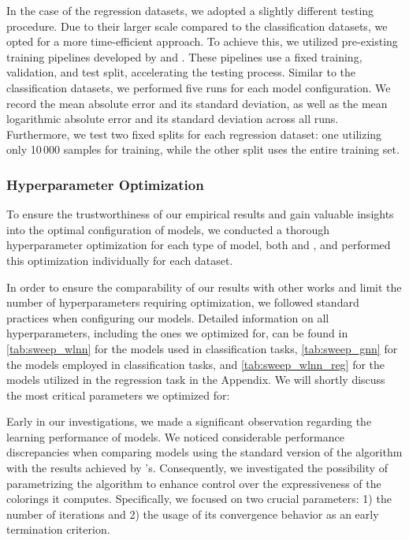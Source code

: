 In the case of the regression datasets, we adopted a slightly different testing procedure. Due to their larger scale compared to the classification datasets, we opted for a more time-efficient approach. To achieve this, we utilized pre-existing training pipelines developed by \cite{Mor+2020} and \cite{Morris2022}. These pipelines use a fixed training, validation, and test split, accelerating the testing process. Similar to the classification datasets, we performed five runs for each model configuration. We record the mean absolute error and its standard deviation, as well as the mean logarithmic absolute error and its standard deviation across all runs. Furthermore, we test two fixed splits for each regression dataset: one utilizing only 10\,000 samples for training, while the other split uses the entire training set. 

\subsubsection{Hyperparameter Optimization}\label{sec:hyperparam}
To ensure the trustworthiness of our empirical results and gain valuable insights into the optimal configuration of \wlnn models, we conducted a thorough hyperparameter optimization for each type of model, both \gnn and \wlnn, and performed this optimization individually for each dataset.

In order to ensure the comparability of our results with other works and limit the number of hyperparameters requiring optimization, we followed standard practices when configuring our models. Detailed information on all hyperparameters, including the ones we optimized for, can be found in \cref{tab:sweep_wlnn} for the \wlnn models used in classification tasks, \cref{tab:sweep_gnn} for the \gnn models employed in classification tasks, and \cref{tab:sweep_wlnn_reg} for the \wlnn models utilized in the regression task in the Appendix. We will shortly discuss the most critical parameters we optimized for:

Early in our investigations, we made a significant observation regarding the learning performance of \wlnn models. We noticed considerable performance discrepancies when comparing \wlnn models using the standard version of the \wl algorithm with the results achieved by \gnn's. Consequently, we investigated the possibility of parametrizing the \wl algorithm to enhance control over the expressiveness of the colorings it computes. Specifically, we focused on two crucial parameters: 1) the number of iterations and 2) the usage of its convergence behavior as an early termination criterion.

